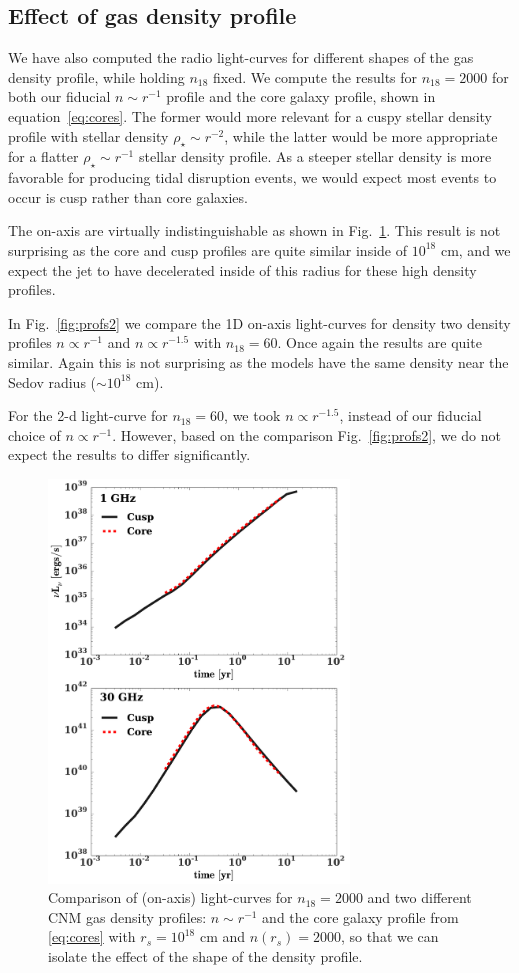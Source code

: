 \documentclass[usenatbib,fleqn]{mnras}
\begin{document}
\subsection{Effect of gas density profile}
\label{sec:profileComp}
We have also computed the radio light-curves for different shapes of
the gas density profile, while holding $n_{18}$ fixed. We compute the
results for $n_{18}=2000$ for both our fiducial $n\sim r^{-1}$ profile and
the core galaxy profile, shown in equation~\eqref{eq:cores}. The
former would more relevant for a cuspy stellar density profile with
stellar density $\rho_{\star}\sim r^{-2}$, while the latter would be more
appropriate for a flatter $\rho_{\star}\sim r^{-1}$ stellar density
profile. As a steeper stellar density is more favorable for producing
tidal disruption events, we would expect most events to occur is cusp
rather than core galaxies.

The on-axis are virtually indistinguishable as shown in
Fig.~\ref{fig:cores}. This result is not surprising as
the core and cusp profiles are quite similar inside of $10^{18}$ cm,
and we expect the jet to have decelerated inside of this radius for
these high density profiles.

In Fig.~\ref{fig:profs2} we compare the 1D on-axis light-curves for
density two density profiles $n\propto r^{-1}$ and $n\propto r^{-1.5}$
with $n_{18}=60$. Once again the results are quite similar. Again this
is not surprising as the models have the same density near the Sedov
radius ($\sim 10^{18}$ cm).  

For the 2-d light-curve for $n_{18}=60$, we took $n\propto r^{-1.5}$,
instead of our fiducial choice of $n \propto r^{-1}$. However, based
on the comparison Fig.~\ref{fig:profs2}, we do not expect the results
to differ significantly.
 

\begin{figure} 
  \includegraphics[width=8cm]{fig_cores.pdf}
  \caption{\label{fig:cores} Comparison of (on-axis) light-curves for
    $n_{18}=2000$ and two different CNM gas density profiles: $n\sim
    r^{-1}$ and the core galaxy profile from \eqref{eq:cores} with
    $r_s=10^{18}$ cm and $n(r_s)=2000$, so that we can isolate the
    effect of the shape of the density profile.}
\end{figure}
\end{document}
